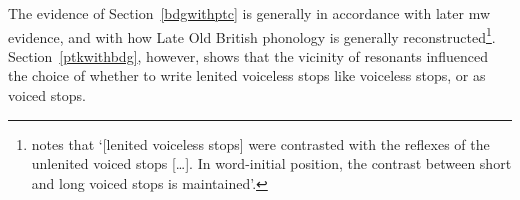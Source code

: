 The evidence of Section~\ref{bdgwithptc} is generally in accordance with later \gls{mw} evidence, and with how Late Old British phonology is generally reconstructed\footnote{\Textcite[31]{schrijver_old_2011} notes that `[lenited voiceless stops] were contrasted with the reflexes of the unlenited voiced stops […]. In word-initial position, the contrast between short and long voiced stops is maintained'.}. Section~\ref{ptkwithbdg}, however, shows that the vicinity of resonants influenced the choice of whether to write lenited voiceless stops like voiceless stops, or as voiced stops.






